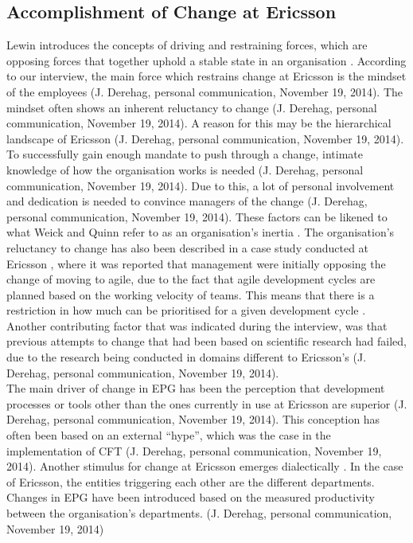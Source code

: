 \documentclass[final_report_innit.tex]{subfiles}
\begin{document}
\subsection{Accomplishment of Change at Ericsson}
Lewin introduces the concepts of driving and restraining forces, which are opposing forces that together uphold a stable state in an organisation \cite{burnes2004kurt}. According to our interview, the main force which restrains change at Ericsson is the mindset of the employees (J. Derehag, personal communication, November 19, 2014). The mindset often shows an inherent reluctancy to change (J. Derehag, personal communication, November 19, 2014). A reason for this may be the hierarchical landscape of Ericsson (J. Derehag, personal communication, November 19, 2014). To successfully gain enough mandate to push through a change, intimate knowledge of how the organisation works is needed (J. Derehag, personal communication, November 19, 2014). Due to this, a lot of personal involvement and dedication is needed to convince managers of the change (J. Derehag, personal communication, November 19, 2014). These factors can be likened to what Weick and Quinn refer to as an organisation's inertia \cite{weick1999organizational}. The organisation's reluctancy to change has also been described in a case study conducted at Ericsson \cite{karlstrom2005combining}, where it was reported that management were initially opposing the change of moving to agile, due to the fact that agile development cycles are planned based on the working velocity of teams. This means that there is a restriction in how much can be prioritised for a given development cycle \cite{karlstrom2005combining}. Another contributing factor that was indicated during the interview, was that previous attempts to change that had been based on scientific research had failed, due to the research being conducted in domains different to Ericsson's (J. Derehag, personal communication, November 19, 2014). 
\\

The main driver of change in EPG has been the perception that development processes or tools other than the ones currently in use at Ericsson are superior (J. Derehag, personal communication, November 19, 2014). This conception has often been based on an external ``hype'', which was the case in the implementation of CFT (J. Derehag, personal communication, November 19, 2014). Another stimulus for change at Ericsson emerges dialectically \cite{van1995explaining}. In the case of Ericsson, the entities triggering each other are the different departments. Changes in EPG have been introduced based on the measured productivity between the organisation's departments. (J. Derehag, personal communication, November 19, 2014)
\\
\end{document}
